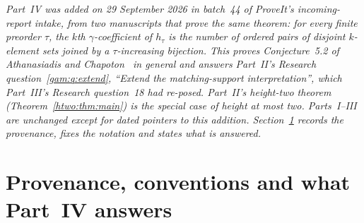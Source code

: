 \documentclass[11pt]{article}
\numberwithin{equation}{section}
\theoremstyle{definition}
\begin{document}
\noindent\emph{Part~IV was added on 29 September 2026 in batch~44 of
ProveIt's incoming-report intake, from two manuscripts that prove the same
theorem: for every finite preorder $\tau$, the $k$th $\gamma$-coefficient of
$h_\tau$ is the number of ordered pairs of disjoint $k$-element sets joined
by a $\tau$-increasing bijection. This proves Conjecture~5.2 of Athanasiadis
and Chapoton~\cite{AC} in general and answers Part~II's Research
question~\ref{gam:q:extend}, ``Extend the matching-support interpretation'',
which Part~III's Research question~18 had re-posed. Part~II's height-two
theorem (Theorem~\ref{htwo:thm:main}) is the special case of height at most
two. Parts~I--III are unchanged except for dated pointers to this addition.
Section~\ref{gam:sec:prov} records the provenance, fixes the notation and
states what is answered.}

\section{Provenance, conventions and what Part~IV answers}
\label{gam:sec:prov}
\end{document}
